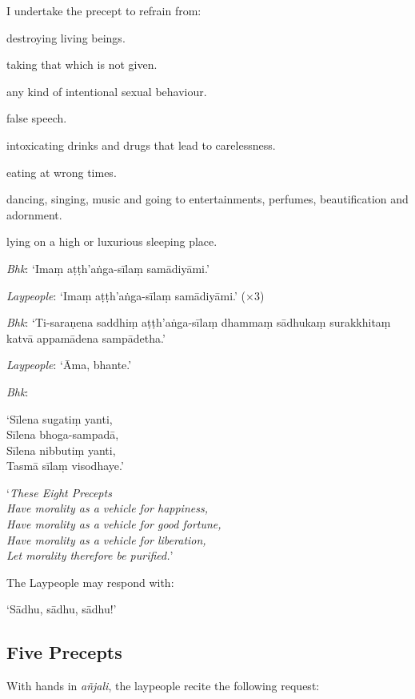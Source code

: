 
I undertake the precept to refrain from:

\begin{packeditemize}

\item destroying living beings.
\item taking that which is not given.
\item any kind of intentional sexual behaviour.
\item false speech.
\item intoxicating drinks and drugs that lead to carelessness.
\item eating at wrong times.
\item dancing, singing, music and going to entertainments, perfumes, beautification and adornment.
\item lying on a high or luxurious sleeping place.

\end{packeditemize}

\emph{Bhk}: ‘Imaṃ aṭṭh'aṅga-sīlaṃ samādiyāmi.’

\emph{Laypeople}: ‘Imaṃ aṭṭh'aṅga-sīlaṃ samādiyāmi.’ (×3)

\emph{Bhk}: ‘Ti-saraṇena saddhiṃ aṭṭh'aṅga-sīlaṃ dhammaṃ sādhukaṃ surakkhitaṃ
katvā appamādena sampādetha.’

\emph{Laypeople}: ‘Āma, bhante.’

\emph{Bhk}:

‘Sīlena sugatiṃ yanti,\\
Sīlena bhoga-sampadā,\\
Sīlena nibbutiṃ yanti,\\
Tasmā sīlaṃ visodhaye.’

‘\emph{These Eight Precepts\\
  Have morality as a vehicle for happiness,\\
  Have morality as a vehicle for good fortune,\\
  Have morality as a vehicle for liberation,\\
  Let morality therefore be purified.}’

The Laypeople may respond with:

‘Sādhu, sādhu, sādhu!’

\subsection{Five Precepts}

With hands in \emph{añjali}, the laypeople recite the following request:

